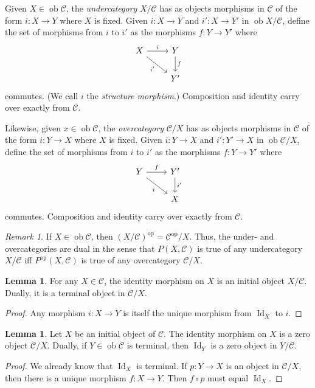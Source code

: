 \documentclass[10pt,letterpaper,cm]{nupset}
\theoremstyle{definition}
\theoremstyle{theorem}
\newtheorem{lemma}[definition]{Lemma}
\theoremstyle{remark}
\newtheorem{remark}[definition]{Remark}
\newcommand{\1}{\mathbf{1}}
\renewcommand{\c}{\mathscr{C}}
\newcommand{\0}{\vec 0}
\DeclareMathOperator{\id}{Id}
\DeclareMathOperator{\op}{op}
\DeclareMathOperator{\ob}{ob}
\begin{document}
Given $X \in \ob \c$, the \textit{undercategory} ${X}/{\c}$ has as objects morphisms in $\c$ of the form $i : X \to Y$ where $X$ is fixed. Given $i: X \to Y$ and  $i' : X \to Y'$ in $\ob {X}/{\c}$, define the set of morphisms from $i$ to $i'$ as the morphisms $f: Y \to Y'$ where
\[ \begin{tikzcd}
X \arrow[r, "i"] \arrow[swap, dr,  " i' "] & Y \arrow[d, "f"] \\%
 & Y'
\end{tikzcd}
\]
commutes. (We call $i$ the \textit{structure morphism}.)
 Composition and identity carry over exactly from $\c$.

\medskip

Likewise, given $x \in \ob \c$, the \textit{overcategory} ${\c}/{X}$ has as objects morphisms in $\c$ of the form $i : Y \to X$ where $X$ is fixed. Given $i:  Y \to X$ and  $i' : Y' \to X$ in $\ob {\c}/{X}$, define the set of morphisms from $i$ to $i'$ as the morphisms $f: Y \to Y'$ where
\[ \begin{tikzcd}
Y \arrow[r, "f"] \arrow[swap, dr,  " i "] & Y' \arrow[d, "i '"] \\%
 & X
\end{tikzcd}
\]
commutes.
 Composition and identity carry over exactly from $\c$.


\begin{remark}
If $X \in \ob \c$, then $\left({X}/{\c}\right)^{\op} = {\c^{\op}}/{X}$. Thus, the under- and overcategories are dual in the sense that $P(X, \c)$ is true of any undercategory ${X}/{\c}$ iff $P^{\op}(X, \c)$ is true of any overcategory ${\c}/{X}$. 
\end{remark}

\begin{lemma}
For any $X \in \c$, the identity morphism on $X$ is an initial object ${X}/{\c}$. Dually, it is a terminal object in ${\c}/{X}$.
\end{lemma}
\begin{proof}
Any morphism $i: X \to Y$ is itself the unique morphism from $\id_X$ to $i$.
\end{proof}

\begin{lemma}
Let $X$ be an initial object of $\c$. The identity morphism on $X$ is a zero object ${\c}/{X}$. Dually, if $Y \in \ob \c$ is terminal, then $\id_Y$ is a zero object in ${Y}/{\c}$.
\end{lemma}
\begin{proof}
We already know that $\id_X$ is terminal. If $p: Y \to X$ is an object in ${\c}/{X}$, then there is a unique morphism $f: X \to Y$. Then $f\circ p$ must equal $\id_X$.
\end{proof}
\end{document}
